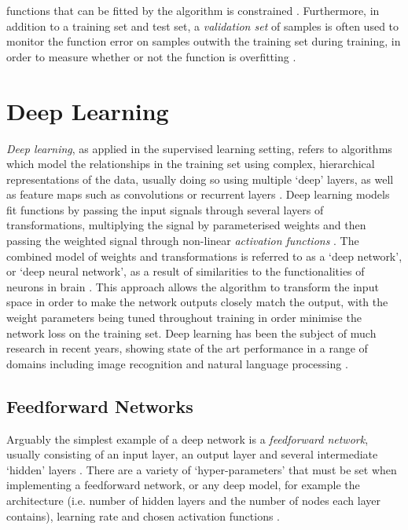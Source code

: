functions that can be fitted by the algorithm is constrained \cite{Theodoridis2009}. Furthermore, in addition to a training set and test set, a \textit{validation set} of samples is often used to monitor the function error on samples outwith the training set during training, in order to measure whether or not the function is overfitting \cite{Witten2011}. 

\section{Deep Learning}
\textit{Deep learning}, as applied in the supervised learning setting, refers to algorithms which model the relationships in the training set using complex, hierarchical representations of the data, usually doing so using multiple `deep' layers, as well as feature maps such as convolutions or recurrent layers \cite{lecun2015deep}. Deep learning models fit functions by passing the input signals through several layers of transformations, multiplying the signal by parameterised weights and then passing the weighted signal through non-linear \textit{activation functions} \cite{Witten2011}. The combined model of weights and transformations is referred to as a `deep network', or `deep neural network', as a result of similarities to the functionalities of neurons in brain \cite{hinton2005kind}. This approach allows the algorithm to transform the input space in order to make the network outputs closely match the output, with the weight parameters being tuned throughout training in order minimise the network loss on the training set. Deep learning has been the subject of much research in recent years, showing state of the art performance in a range of domains including image recognition and natural language processing \cite{lecun2015deep} \cite{bengio2012practical}.

\subsection{Feedforward Networks}
Arguably the simplest example of a deep network is a \textit{feedforward network}, usually consisting of an input layer, an output layer and several intermediate `hidden' layers \cite{Witten2011}. There are a variety of `hyper-parameters' that must be set when implementing a feedforward network, or any deep model, for example the architecture (i.e. number of hidden layers and the number of nodes each layer contains), learning rate and chosen activation functions \cite{Witten2011}.

